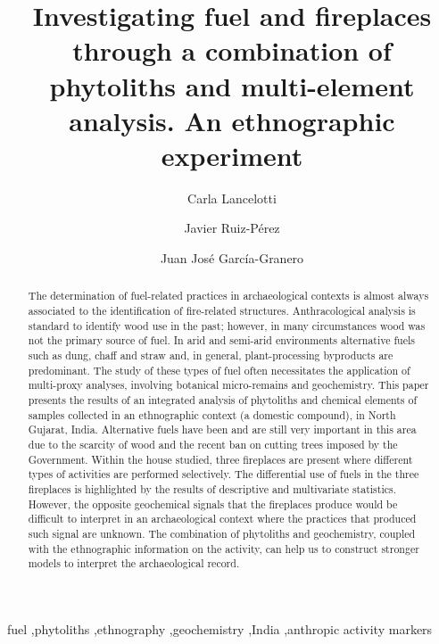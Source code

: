 \documentclass[authoryear,preprint,review,12pt]{elsarticle}
\begin{document}
\begin{frontmatter}

\title{Investigating fuel and fireplaces through a combination of phytoliths and multi-element analysis. An ethnographic experiment}

\author[label1,label2]{Carla Lancelotti}
\author[label1,label3]{Javier Ruiz-Pérez}
\author[label1,label4]{Juan José García-Granero}
\address[label1]{CaSEs - Complexity and Socio-Ecological Dynamics Research Group}
\address[label2]{Department of Humanities, Pompeu Fabra University, Barcelona (Spain)}
\address[label3]{Department of Animal and Plant Biology and Ecology, Faculty of Biosciences, Autonomous University of Barcelona, Barcelona (Spain)}
\address[label4]{Department of Archaeology and Anthropology, Instituciò Milà i Fontanals, Spanish Research Council (CSIC)}


\begin{abstract}
The determination of fuel-related practices in archaeological contexts is almost always associated to the identification of fire-related structures. Anthracological analysis is standard to identify wood use in the past; however, in many circumstances wood was not the primary source of fuel. In arid and semi-arid environments alternative fuels such as dung, chaff and straw and, in general, plant-processing byproducts are predominant. The study of these types of fuel often necessitates the application of multi-proxy analyses, involving botanical micro-remains and geochemistry.
This paper presents the results of an integrated analysis of phytoliths and chemical elements of samples collected in an ethnographic context (a domestic compound), in North Gujarat, India. Alternative fuels have been and are still very important in this area due to the scarcity of wood and the recent ban on cutting trees imposed by the Government. Within the house studied, three fireplaces are present where different types of activities are performed selectively. The differential use of fuels in the three fireplaces is highlighted by the results of descriptive and multivariate statistics. However, the opposite geochemical signals that the fireplaces produce would be difficult to interpret in an archaeological context where the practices that produced such signal are unknown. The combination of phytoliths and geochemistry, coupled with the ethnographic information on the activity, can help us to construct stronger models to interpret the archaeological record.
\end{abstract}

\begin{keyword}
fuel \sep phytoliths \sep ethnography \sep geochemistry \sep India \sep anthropic activity markers
\end{keyword}

\end{frontmatter}
\end{document}
